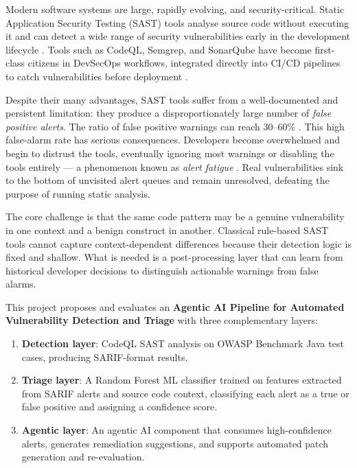 \documentclass[conference]{IEEEtran}
\begin{document}
Modern software systems are large, rapidly evolving, and security-critical.
Static Application Security Testing (SAST) tools analyse source code without
executing it and can detect a wide range of security vulnerabilities early in
the development lifecycle \cite{hegedus2022sca}. Tools such as CodeQL, Semgrep,
and SonarQube have become first-class citizens in DevSecOps workflows, integrated
directly into CI/CD pipelines to catch vulnerabilities before deployment
\cite{syed2025agentic}.

Despite their many advantages, SAST tools suffer from a well-documented and
persistent limitation: they produce a disproportionately large number of
\emph{false positive alerts}. The ratio of false positive warnings can reach
30--60\% \cite{hegedus2022sca}. This high false-alarm rate has serious
consequences. Developers become overwhelmed and begin to distrust the tools,
eventually ignoring most warnings or disabling the tools entirely --- a
phenomenon known as \emph{alert fatigue} \cite{hegedus2022sca}.
Real vulnerabilities sink to the bottom of unvisited alert queues and remain
unresolved, defeating the purpose of running static analysis.

The core challenge is that the same code pattern may be a genuine vulnerability
in one context and a benign construct in another. Classical rule-based SAST tools
cannot capture context-dependent differences because their detection logic is
fixed and shallow. What is needed is a post-processing layer that can learn from
historical developer decisions to distinguish actionable warnings from false alarms.

This project proposes and evaluates an \textbf{Agentic AI Pipeline for Automated
Vulnerability Detection and Triage} with three complementary layers:

\begin{enumerate}[leftmargin=*, label=\arabic*.]
  \item \textbf{Detection layer}: CodeQL SAST analysis on OWASP Benchmark Java
        test cases, producing SARIF-format results.
  \item \textbf{Triage layer}: A Random Forest ML classifier trained on features
        extracted from SARIF alerts and source code context, classifying each
        alert as a true or false positive and assigning a confidence score.
  \item \textbf{Agentic layer}: An agentic AI component that consumes
        high-confidence alerts, generates remediation suggestions, and supports
        automated patch generation and re-evaluation.
\end{enumerate}
\end{document}
